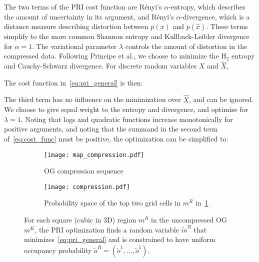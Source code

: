 The two terms of the PRI cost function are R\'{e}nyi's $\alpha$-entropy, which describes
the amount of uncertainty in its argument, and R\'{e}nyi's $\alpha$-divergence, which is a
distance measure describing distortion between $p(x)$ and $p(\hat{x})$. These terms simplify
to the more common Shannon entropy and Kullback-Leibler divergence for $\alpha = 1$. The
variational parameter $\lambda$ controls the amount of distortion in the compressed data.
Following Principe et al., we choose to minimize the $\text{H}_{2}$ entropy and
Cauchy-Schwarz divergence. For discrete random variables $X$ and $\hat{X}$,
%

The cost function in~\eqref{eq:pri_general} is then:
%

The third term has no influence on the minimization over $\hat{X}$, and can be ignored. We
choose to give equal weight to the entropy and divergence, and optimize for $\lambda=1$.
Noting that logs and quadratic functions increase monotonically for positive arguments,
and noting that the summand in the second term of~\eqref{eq:cost_func} must be positive,
the optimization can be simplified to:
%

\begin{figure}
    \centering
    \begin{subfigure}[t]{0.45\textwidth}
        \centering
        \texttt{[image: map\_compression.pdf]}
        \caption{OG compression sequence \label{fig:pri_compression1}}
    \end{subfigure}
    \hfill
    \begin{subfigure}[t]{0.45\textwidth}
        \centering
        \texttt{[image: compression.pdf]}
        \caption{Probability space of the top two grid cells
        in $m^{R}$ in~\ref{fig:pri_compression1} \label{fig:pri_compression2}}
    \end{subfigure}
    \caption[Occupancy grid compression sequence.]{For each square (cubic in 3D) region $m^{R}$ in the uncompressed OG $m^{K}$,
    the PRI optimization finds a random variable $\tilde{m}^{R}$ that
    minimizes~\eqref{eq:pri_general} and is constrained to have uniform occupancy
    probability $\tilde{o}^{R} = (\tilde{o}^{1}, \dots, \tilde{o}^{1})$.
  \label{fig:pri_compression}}
\end{figure}


